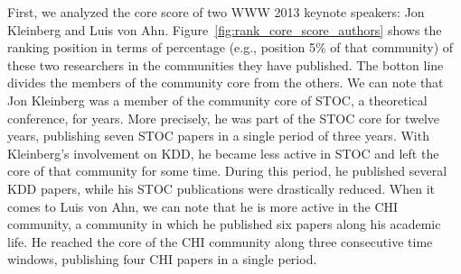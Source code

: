 First, we analyzed the core score of two WWW 2013 keynote speakers: Jon Kleinberg and Luis von Ahn.  Figure~\ref{fig:rank_core_score_authors} shows the ranking position in terms of
percentage (e.g., position 5\% of that community) of these two researchers in the communities they have published. The botton line divides the members of the community core from the others.
We can note that Jon Kleinberg was a member of the community core of STOC, a theoretical conference, for years. More precisely, he was part of the STOC core for twelve years,
publishing seven STOC papers in a single period of three years. With Kleinberg's involvement on KDD, he became less active in STOC and left the core of that community for some time.
During this period, he published several KDD papers, while his STOC publications were drastically reduced.  When it comes to Luis von Ahn, we can note that he is more active in
the CHI community, a community in which he published six papers along his academic life. He reached the core of the CHI community along three consecutive time windows,
publishing four CHI papers in a single period.




